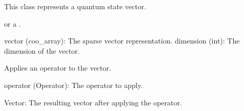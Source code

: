 \documentclass[letterpaper,10pt,english]{sphinxmanual}
\begin{document}
\begin{fulllineitems}
\label{\detokenize{index:utils.tensor.Vector}}
\pysigstartsignatures
{}
\pysigstopsignatures
\sphinxAtStartPar
This class represents a quantum state vector.
\begin{description}
\begin{description}
\sphinxAtStartPar
or a .

\end{description}

\sphinxAtStartPar
vector (coo\_array): The sparse vector representation.
dimension (int): The dimension of the vector.

\end{description}

\begin{fulllineitems}
\label{\detokenize{index:utils.tensor.Vector.apply}}
\pysigstartsignatures
{}
\pysigstopsignatures
\sphinxAtStartPar
Applies an operator to the vector.
\begin{description}
\sphinxAtStartPar
operator (Operator): The operator to apply.

\sphinxAtStartPar
Vector: The resulting vector after applying the operator.

\end{description}

\end{fulllineitems}



\end{fulllineitems}
\end{document}
